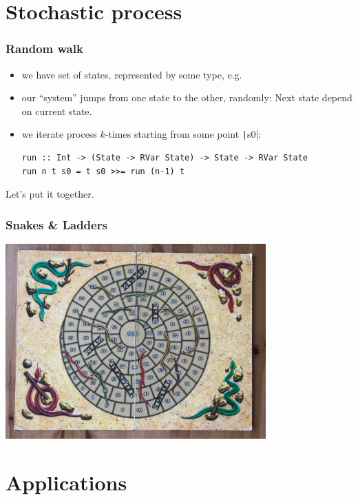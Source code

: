 \documentclass[mathserif, 8pt, handout]{beamer}
\begin{document}
\section{Stochastic process}

\begin{frame}[fragile]
  \frametitle{Random walk}

  \begin{itemize}
  \item we have set of states, represented by some type, e.g.
    \pause
  \item our ``system'' jumps from one state to the other, randomly:
    Next state depend on current state.
    \pause
  \item we iterate process $k$-times starting from some point \texttt|s0|:
\begin{verbatim}
run :: Int -> (State -> RVar State) -> State -> RVar State
run n t s0 = t s0 >>= run (n-1) t
\end{verbatim}
  \end{itemize}

  Let's put it together.
\end{frame}

\begin{frame}
  \frametitle{Snakes \& Ladders}
  \includegraphics[width=10cm]{snakes_ladders.jpg}
\end{frame}

\section{Applications}
\end{document}
